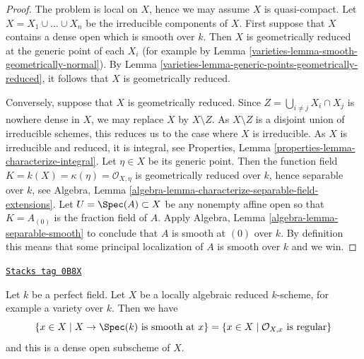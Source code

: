 \begin{proof}

The problem is local on $X$, hence we may assume $X$ is quasi-compact.
Let $X = X_1 \cup \ldots \cup X_n$ be the irreducible components of $X$.
First suppose that $X$ contains a dense open which is smooth over $k$.
Then $X$ is geometrically reduced at the generic point of each $X_i$
(for example by Lemma \ref{varieties-lemma-smooth-geometrically-normal}).
By Lemma \ref{varieties-lemma-generic-points-geometrically-reduced},
it follows that $X$ is geometrically reduced.

\medskip\noindent
Conversely, suppose that $X$ is geometrically reduced.
Since $Z = \bigcup_{i \not = j} X_i \cap X_j$ is nowhere dense in $X$,
we may replace $X$ by $X \setminus Z$. As $X \setminus Z$ is a
disjoint union of irreducible schemes, this reduces us to the case
where $X$ is irreducible. As $X$ is irreducible and reduced, it is
integral, see
Properties, Lemma \ref{properties-lemma-characterize-integral}.
Let $\eta \in X$ be its generic point.
Then the function field $K = k(X) = \kappa(\eta) = \mathcal{O}_{X, \eta}$
is geometrically reduced over $k$, hence separable over $k$, see
Algebra, Lemma \ref{algebra-lemma-characterize-separable-field-extensions}.
Let $U = \Spec(A) \subset X$ be any nonempty affine open
so that $K = A_{(0)}$ is the fraction field of $A$. Apply
Algebra, Lemma \ref{algebra-lemma-separable-smooth}
to conclude that $A$ is smooth at $(0)$ over $k$.
By definition this means that some principal localization
of $A$ is smooth over $k$ and we win.
\end{proof}

\begin{lemma}
\label{varieties-lemma-dense-smooth-open-variety-over-perfect-field}
\href{https://stacks.math.columbia.edu/tag/0B8X}{\texttt{Stacks tag 0B8X}}

Let $k$ be a perfect field. Let $X$ be a locally algebraic
reduced $k$-scheme, for example a variety over $k$. Then we have
$$
\{x \in X \mid X \to \Spec(k)\text{ is smooth at }x\} =
\{x \in X \mid \mathcal{O}_{X, x}\text{ is regular}\}
$$
and this is a dense open subscheme of $X$.
\end{lemma}

